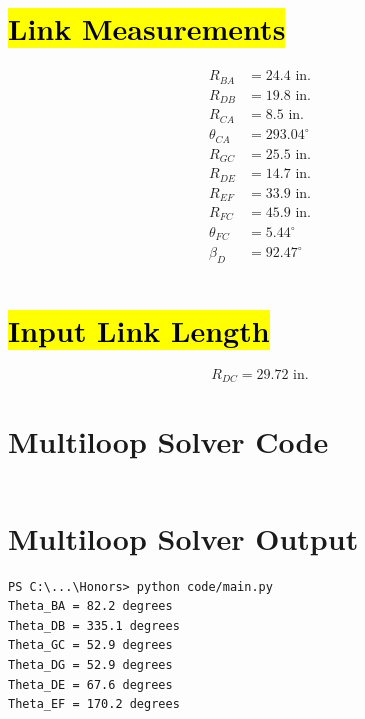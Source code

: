 \documentclass[hidelinks]{article}
\begin{document}
    \FloatBarrier\section*{\hl{Link Measurements}}
    \begin{align*}
        R_{BA}&=24.4 \text{ in.} \\
        R_{DB}&=19.8 \text{ in.} \\
        R_{CA}&=8.5 \text{ in.} \\
        \theta_{CA}&=293.04^\circ \\
        R_{GC}&=25.5 \text{ in.} \\
        R_{DE}&=14.7 \text{ in.} \\
        R_{EF}&=33.9 \text{ in.} \\
        R_{FC}&=45.9 \text{ in.} \\
        \theta_{FC}&=5.44^\circ \\
        \beta_{D}&=92.47^\circ \\
    \end{align*}

    \FloatBarrier\section*{\hl{Input Link Length}}
    \begin{equation*}
        R_{DC}=29.72 \text{ in.}
    \end{equation*}
        
    \FloatBarrier\section*{Multiloop Solver Code}
    
    \inputminted[python3=true]{python}{../code/main.py}

    \section*{Multiloop Solver Output}
    \begin{verbatim}
PS C:\...\Honors> python code/main.py
Theta_BA = 82.2 degrees
Theta_DB = 335.1 degrees
Theta_GC = 52.9 degrees
Theta_DG = 52.9 degrees
Theta_DE = 67.6 degrees
Theta_EF = 170.2 degrees
    \end{verbatim}
\end{document}
